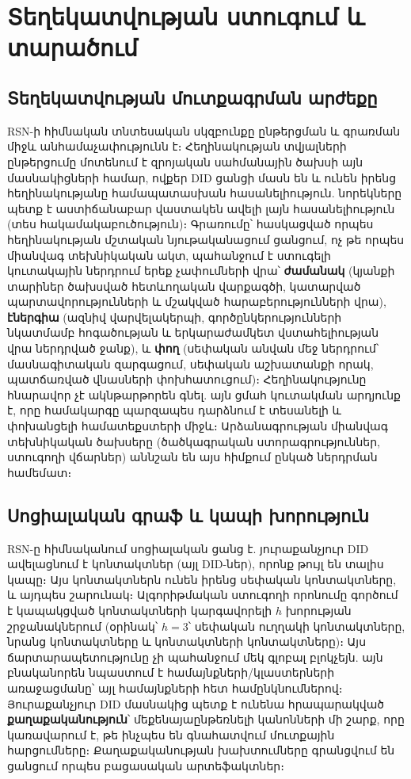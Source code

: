 \documentclass[11pt,a4paper,twocolumn]{article}
\begin{document}
\section{Տեղեկատվության ստուգում և տարածում}

\subsection{Տեղեկատվության մուտքագրման արժեքը}

RSN-ի հիմնական տնտեսական սկզբունքը ընթերցման և գրառման միջև անհամաչափությունն է։ Հեղինակության տվյալների ընթերցումը մոտենում է զրոյական սահմանային ծախսի այն մասնակիցների համար, ովքեր DID ցանցի մասն են և ունեն իրենց հեղինակությանը համապատասխան հասանելիություն. նորեկները պետք է աստիճանաբար վաստակեն ավելի լայն հասանելիություն (տես հակամակաբուծություն)։ Գրառումը՝ հասկացված որպես հեղինակության մշտական նյութականացում ցանցում, ոչ թե որպես միանվագ տեխնիկական ակտ, պահանջում է ստուգելի կուտակային ներդրում երեք չափումների վրա՝ \textbf{ժամանակ} (կյանքի տարիներ ծախսված հետևողական վարքագծի, կատարված պարտավորությունների և մշակված հարաբերությունների վրա), \textbf{էներգիա} (ազնիվ վարվելակերպի, գործընկերությունների նկատմամբ հոգածության և երկարաժամկետ վստահելիության վրա ներդրված ջանք), և \textbf{փող} (սեփական անվան մեջ ներդրում՝ մասնագիտական զարգացում, սեփական աշխատանքի որակ, պատճառված վնասների փոխհատուցում)։ Հեղինակությունը հնարավոր չէ ակնթարթորեն գնել. այն ցմահ կուտակման արդյունք է, որը համակարգը պարզապես դարձնում է տեսանելի և փոխանցելի համատեքստերի միջև։ Արձանագրության միանվագ տեխնիկական ծախսերը (ծածկագրական ստորագրություններ, ստուգողի վճարներ) աննշան են այս հիմքում ընկած ներդրման համեմատ։

\subsection{Սոցիալական գրաֆ և կապի խորություն}

RSN-ը հիմնականում սոցիալական ցանց է. յուրաքանչյուր DID ավելացնում է կոնտակտներ (այլ DID-ներ), որոնք թույլ են տալիս կապը։ Այս կոնտակտներն ունեն իրենց սեփական կոնտակտները, և այդպես շարունակ։ Ալգորիթմական ստուգողի որոնումը գործում է կապակցված կոնտակտների կարգավորելի $h$ խորության շրջանակներում (օրինակ՝ $h=3$՝ սեփական ուղղակի կոնտակտները, նրանց կոնտակտները և կոնտակտների կոնտակտները)։ Այս ճարտարապետությունը չի պահանջում մեկ գլոբալ բլոկչեյն. այն բնականորեն նպաստում է համայնքների/կլաստերների առաջացմանը՝ այլ համայնքների հետ համընկնումներով։ Յուրաքանչյուր DID մասնակից պետք է ունենա հրապարակված \textbf{քաղաքականություն}՝ մեքենայաընթեռնելի կանոնների մի շարք, որը կառավարում է, թե ինչպես են գնահատվում մուտքային հարցումները։ Քաղաքականության խախտումները գրանցվում են ցանցում որպես բացասական արտեֆակտներ։
\end{document}
